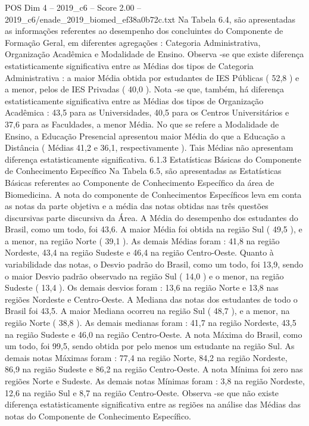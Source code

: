 \begin{textsample}{POS Dim 4 – 2019\_c6 – Score 2.00 – 2019\_c6/enade\_2019\_biomed\_ef38a0b72c.txt}
Na Tabela 6.4, são apresentadas as informações referentes ao desempenho dos concluintes do Componente de Formação Geral, em diferentes agregações : Categoria Administrativa, Organização Acadêmica e Modalidade de Ensino.
Observa -se que existe diferença estatisticamente significativa entre as Médias dos tipos de Categoria Administrativa : a maior Média obtida por estudantes de IES Públicas ( 52,8 ) e a menor, pelos de IES Privadas ( 40,0 ).
Nota -se que, também, há diferença estatisticamente significativa entre as Médias dos tipos de Organização Acadêmica : 43,5 para as Universidades, 40,5 para os Centros Universitários e 37,6 para as Faculdades, a menor Média.
No que se refere a Modalidade de Ensino, a Educação Presencial apresentou maior Média do que a Educação a Distância ( Médias 41,2 e 36,1, respectivamente ).
Tais Médias não apresentam diferença estatisticamente significativa. 6.1.3 Estatísticas Básicas do Componente de Conhecimento Específico Na Tabela 6.5, são apresentadas as Estatísticas Básicas referentes ao Componente de Conhecimento Específico da área de Biomedicina.
A nota do componente de Conhecimentos Específicos leva em conta as notas da parte objetiva e a média das notas obtidas nas três questões discursivas parte discursiva da Área.
A Média do desempenho dos estudantes do Brasil, como um todo, foi 43,6.
A maior Média foi obtida na região Sul ( 49,5 ), e a menor, na região Norte ( 39,1 ).
As demais Médias foram : 41,8 na região Nordeste, 43,4 na região Sudeste e 46,4 na região Centro-Oeste.
Quanto à variabilidade das notas, o Desvio padrão do Brasil, como um todo, foi 13,9, sendo o maior Desvio padrão observado na região Sul ( 14,0 ) e o menor, na região Sudeste ( 13,4 ).
Os demais desvios foram : 13,6 na região Norte e 13,8 nas regiões Nordeste e Centro-Oeste.
A Mediana das notas dos estudantes de todo o Brasil foi 43,5.
A maior Mediana ocorreu na região Sul ( 48,7 ), e a menor, na região Norte ( 38,8 ).
As demais medianas foram : 41,7 na região Nordeste, 43,5 na região Sudeste e 46,0 na região Centro-Oeste.
A nota Máxima do Brasil, como um todo, foi 99,5, sendo obtida por pelo menos um estudante na região Sul.
As demais notas Máximas foram : 77,4 na região Norte, 84,2 na região Nordeste, 86,9 na região Sudeste e 86,2 na região Centro-Oeste.
A nota Mínima foi zero nas regiões Norte e Sudeste.
As demais notas Mínimas foram : 3,8 na região Nordeste, 12,6 na região Sul e 8,7 na região Centro-Oeste.
Observa -se que não existe diferença estatisticamente significativa entre as regiões na análise das Médias das notas do Componente de Conhecimento Específico.

\end{textsample}
